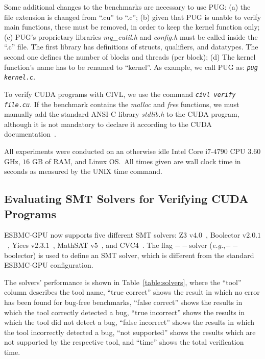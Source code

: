 \documentclass[times, doublespace]{cpeauth}
\begin{document}
Some additional changes to the benchmarks are necessary to use PUG: 
(a) the file extension is changed from ``.cu'' to ``.c''; 
(b) given that PUG is unable to verify main functions, these must be removed, in order to keep the kernel function only; 
(c) PUG's proprietary libraries \textit{my\_cutil.h} and \textit{config.h} must be called inside the ``.c'' file. The first library has definitions of structs, qualifiers, and datatypes. The second one defines the number of blocks and threads (per block); 
(d) The kernel function's name has to be renamed to ``kernel''. As example, we call PUG as: \emph{\tt pug kernel.c}.

To verify CUDA programs with CIVL, we use the command \emph{\tt civl verify file.cu}. If the benchmark contains the \textit{malloc} and \textit{free} functions, we must manually add the standard ANSI-C library \textit{stdlib.h} to the CUDA program, although it is not mandatory to declare it according to the CUDA documentation~\cite{cuda:2012}.

All experiments were conducted on an otherwise idle Intel Core i$7$-$4790$ CPU $3$.$60$ GHz, $16$ GB of RAM, and Linux OS.\ All times given are wall clock time in seconds as measured by the UNIX time command.

\subsection{Evaluating SMT Solvers for Verifying CUDA Programs}
\vspace{-2pt}

ESBMC-GPU now supports five different SMT solvers: Z$3$ v$4$.$0$~\cite{Moura:2008}, Boolector v$2$.$0$.$1$~\cite{Brummayer:2009}, Yices v$2$.$3$.$1$~\cite{Dutertre:2014}, MathSAT v$5$~\cite{Cimatti:2013}, and CVC4~\cite{Deters:2014}. The flag $--$solver (\textit{e.g.},$--$boolector) is used to define an SMT solver, which is different from the standard ESBMC-GPU configuration. 

The solvers' performance is shown in Table~\ref{table:solvers}, where the 
``tool'' column describes the tool name, 
``true correct'' shows the result in which no error has been found for bug-free benchmarks,
``false correct'' shows the results in which the tool correctly detected a bug,
``true incorrect'' shows the results in which the tool did not detect a bug,
``false incorrect'' shows the results in which the tool incorrectly detected a bug,
``not supported'' shows the results which are not supported by the respective tool,
and ``time'' shows the total verification time.
\end{document}

